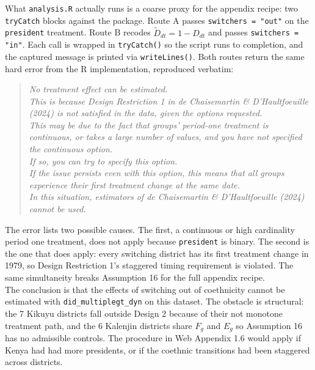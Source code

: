 What \texttt{analysis.R} actually runs is a coarse proxy for the appendix recipe: two \texttt{tryCatch} blocks against the package. Route A passes \texttt{switchers = "out"} on the \texttt{president} treatment. Route B recodes $\widetilde D_{dt} = 1 - D_{dt}$ and passes \texttt{switchers = "in"}. Each call is wrapped in \texttt{tryCatch()} so the script runs to completion, and the captured message is printed via \texttt{writeLines()}. Both routes return the same hard error from the R implementation, reproduced verbatim:
\begin{quote}\small\itshape
No treatment effect can be estimated. \\
\hspace*{1em}This is because Design Restriction 1 in de Chaisemartin \& D'Haultfoeuille (2024) is not satisfied in the data, given the options requested. \\
\hspace*{1em}This may be due to the fact that groups' period-one treatment is continuous, or takes a large number of values, and you have not specified the continuous option. \\
\hspace*{1em}If so, you can try to specify this option. \\
\hspace*{1em}If the issue persists even with this option, this means that all groups experience their first treatment change at the same date. \\
\hspace*{1em}In this situation, estimators of de Chaisemartin \& D'Haultfoeuille (2024) cannot be used.
\end{quote}
The error lists two possible causes. The first, a continuous or high cardinality period one treatment, does not apply because \texttt{president} is binary. The second is the one that does apply: every switching district has its first treatment change in 1979, so Design Restriction 1's staggered timing requirement is violated. The same simultaneity breaks Assumption 16 for the full appendix recipe.\\

The conclusion is that the effects of switching out of coethnicity cannot be estimated with \texttt{did\_multiplegt\_dyn} on this dataset. The obstacle is structural: the 7 Kikuyu districts fall outside Design 2 because of their not monotone treatment path, and the 6 Kalenjin districts share $F_g$ and $E_g$ so Assumption 16 has no admissible controls. The procedure in Web Appendix 1.6 would apply if Kenya had had more presidents, or if the coethnic transitions had been staggered across districts.
